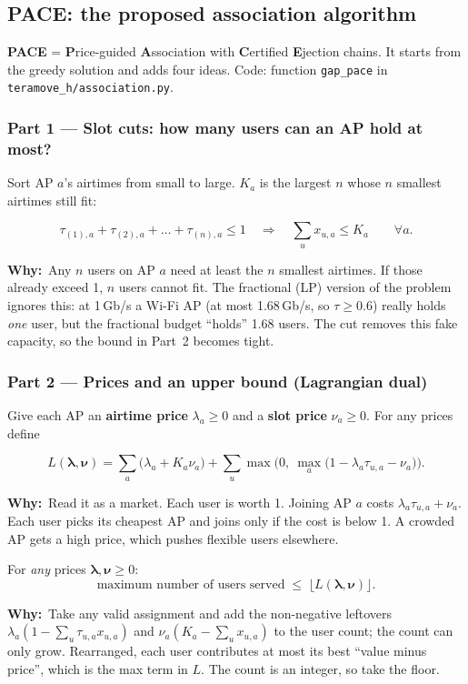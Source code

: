 \documentclass[11pt,a4paper]{article}
\newcommand{\why}[1]{\par\smallskip\noindent\begin{minipage}{\linewidth}\small
  \textcolor{whyc}{\textbf{Why:}}~#1\end{minipage}\par\medskip}
\begin{document}
\subsection{PACE: the proposed association algorithm}
\textbf{PACE} = \textbf{P}rice-guided \textbf{A}ssociation with \textbf{C}ertified
\textbf{E}jection chains. It starts from the greedy solution and adds four ideas. Code:
function \texttt{gap\_pace} in \texttt{teramove\_h/association.py}.

\subsubsection*{Part 1 --- Slot cuts: how many users can an AP hold at most?}
Sort AP $a$'s airtimes from small to large. $K_a$ is the largest $n$ whose $n$ smallest
airtimes still fit:
\begin{keybox}
\[
\tau_{(1),a}+\tau_{(2),a}+\dots+\tau_{(n),a}\le1
\quad\Longrightarrow\quad
\sum_u x_{u,a}\le K_a\qquad\forall a .
\]
\end{keybox}
\why{Any $n$ users on AP $a$ need at least the $n$ smallest airtimes. If those already exceed 1, $n$ users cannot fit. The fractional (LP) version of the problem ignores this: at 1\,Gb/s a Wi-Fi AP (at most 1.68\,Gb/s, so $\tau\ge0.6$) really holds \emph{one} user, but the fractional budget ``holds'' 1.68 users. The cut removes this fake capacity, so the bound in Part~2 becomes tight.}

\subsubsection*{Part 2 --- Prices and an upper bound (Lagrangian dual)}
Give each AP an \textbf{airtime price} $\lambda_a\ge0$ and a \textbf{slot price} $\nu_a\ge0$.
For any prices define
\begin{keybox}
\[
L(\boldsymbol\lambda,\boldsymbol\nu)=\sum_a\big(\lambda_a+K_a\nu_a\big)
+\sum_u\max\Big(0,\ \max_a\big(1-\lambda_a\tau_{u,a}-\nu_a\big)\Big).
\]
\end{keybox}
\why{Read it as a market. Each user is worth 1. Joining AP $a$ costs $\lambda_a\tau_{u,a}+\nu_a$. Each user picks its cheapest AP and joins only if the cost is below 1. A crowded AP gets a high price, which pushes flexible users elsewhere.}

\begin{keybox}
For \emph{any} prices $\boldsymbol\lambda,\boldsymbol\nu\ge0$:
\[
\text{maximum number of users served}\;\le\;\big\lfloor L(\boldsymbol\lambda,\boldsymbol\nu)\big\rfloor .
\]
\end{keybox}
\why{Take any valid assignment and add the non-negative leftovers $\lambda_a(1-\sum_u\tau_{u,a}x_{u,a})$ and $\nu_a(K_a-\sum_u x_{u,a})$ to the user count; the count can only grow. Rearranged, each user contributes at most its best ``value minus price'', which is the max term in $L$. The count is an integer, so take the floor.}
\end{document}
